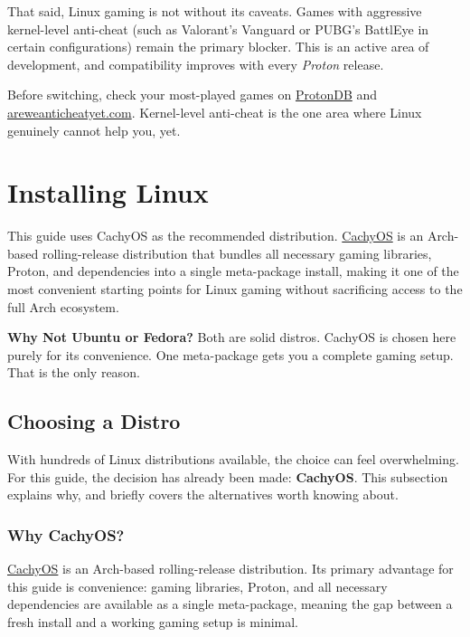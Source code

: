 \documentclass{article}
\begin{document}
\noindent That said, Linux gaming is not without its caveats. Games with aggressive
kernel-level anti-cheat (such as Valorant's Vanguard or PUBG's BattlEye in certain configurations) remain the primary blocker. This is an active area of
development, and compatibility improves with every \textit{Proton} release.

\begin{tcolorbox}[arc=12pt, outer arc=10pt,
  colback=red!5!white, colframe=red!60!black,
  title=\textbf{Anti-Cheat Warning}]
  Before switching, check your most-played games on
  \href{https://www.protondb.com}{ProtonDB} and \href{https://areweanticheatyet.com}{areweanticheatyet.com}. Kernel-level anti-cheat is the one area where Linux genuinely cannot help you, yet.
\end{tcolorbox}

\newpage \section{Installing Linux}

This guide uses CachyOS as the recommended distribution.
\href{https://cachyos.org}{CachyOS} is an Arch-based rolling-release distribution that bundles all necessary gaming libraries, Proton, and dependencies into a single
meta-package install, making it one of the most convenient starting points for Linux gaming without sacrificing access to the full Arch ecosystem.
\begin{callout}{\textbf{Why Not Ubuntu or Fedora?}}
  Both are solid distros. CachyOS is chosen here purely for its convenience.
  One meta-package gets you a complete gaming setup. That is the only reason.
\end{callout}

\subsection{Choosing a Distro}

With hundreds of Linux distributions available, the choice can feel overwhelming. For
this guide, the decision has already been made: \textbf{CachyOS}. This subsection
explains why, and briefly covers the alternatives worth knowing about.

\subsubsection{Why CachyOS?}

\href{https://cachyos.org}{CachyOS} is an Arch-based rolling-release distribution. Its primary advantage for this guide is convenience: gaming libraries, Proton, and
all necessary dependencies are available as a single meta-package, meaning the gap between a fresh install and a working gaming setup is minimal.
\end{document}
